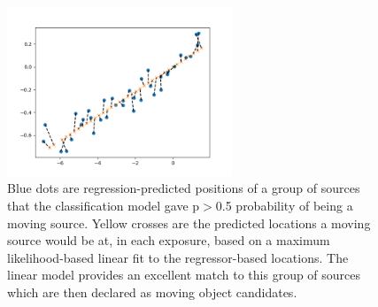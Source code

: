 \documentclass{aastex631}
\begin{document}
\begin{figure}[ht]
    \centering
    \includegraphics[width=0.6\textwidth,keepaspectratio]{Figures/diagnostic.png}
    \caption{Blue dots are regression-predicted positions of a group of sources that the classification model gave p$>$0.5 probability of being a moving source. 
    Yellow crosses are the predicted locations a moving source would be at, in each exposure, based on a maximum likelihood-based linear fit to the regressor-based locations.
    The linear model provides an excellent match to this group of sources which are then declared as moving object candidates.
    }
    \label{fig:linking}
\end{figure}


\end{document}

